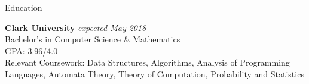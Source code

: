 \documentclass{resume} %
\begin{document}

\begin{rSection}{Education}

{\bf Clark University} \hfill {\em expected May 2018} \\ 
Bachelor's in Computer Science \& Mathematics \smallskip \\
GPA: 3.96/4.0 \\
Relevant Coursework: Data Structures, Algorithms, Analysis of Programming Languages, Automata Theory, Theory of Computation, Probability and Statistics

\end{rSection}

\end{document}
